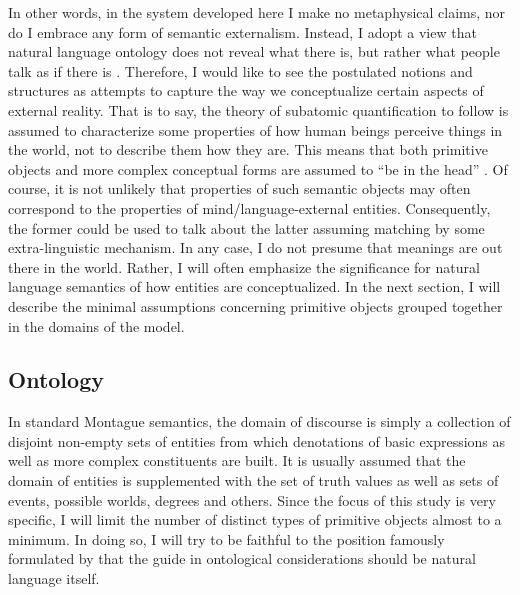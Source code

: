 In other words, in the system developed here I make no metaphysical claims, nor do I embrace any form of semantic externalism. Instead, I adopt a view that natural language ontology does not reveal what there is, but rather what people talk as if there is  \citep[see][]{bach1986natural,pelletier2011descriptive,bach-chao2012metaphysics,moltmann2017natural}. Therefore, I would like to see the postulated notions and structures as attempts to capture the way we conceptualize certain aspects of external reality. That is to say, the theory of subatomic quantification to follow is assumed to characterize some properties of how human beings perceive things in the world, not to describe them how they are. This means that both primitive objects and more complex conceptual forms are assumed to ``be in the head'' \citep[see][]{chomsky2000new}. Of course, it is not unlikely that properties of such semantic objects may often correspond to the properties of mind/language-external entities. Consequently, the former could be used to talk about the latter assuming matching by some extra-linguistic mechanism. In any case, I do not presume that meanings are out there in the world. Rather, I will often emphasize the significance for natural language semantics of how entities are conceptualized. In the next section, I will describe the minimal assumptions concerning primitive objects grouped together in the domains of the model.

\subsection{Ontology}\label{sec:ontology}

In standard Montague semantics, the domain of discourse is simply a collection of disjoint non-empty sets of entities from which denotations of basic expressions as well as more complex constituents are built. It is usually assumed that the domain of entities is supplemented with the set of truth values as well as sets of events, possible worlds, degrees and others. Since the focus of this study is very specific, I will limit the number of distinct types of primitive objects almost to a minimum. In doing so, I will try to be faithful to the position famously formulated by \citet{link1983logical} that the guide in ontological considerations should be natural language itself.

